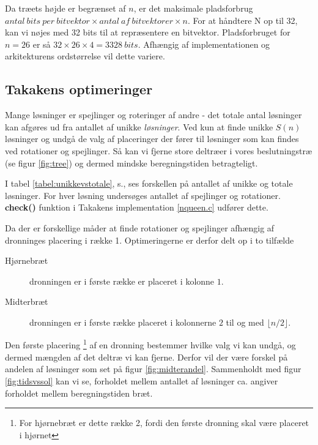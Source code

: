 \documentclass[draft,a4paper,11pt]{article}
\begin{document}
Da træets højde er begrænset af $n$, er det maksimale pladsforbrug $antal\ bits\ per\ bitvektor \times antal\ af\ bitvektorer \times n$. For at håndtere N op til 32, kan vi nøjes med 32 bits til at repræsentere en bitvektor. Pladsforbruget for $n=26$ er så $32\times 26 \times 4 = 3328\ bits$. Afhængig af implementationen og arkitekturens ordstørrelse vil dette variere. 

\subsection{Takakens optimeringer}\label{takalgo}

Mange løsninger er spejlinger og roteringer af andre - det totale antal løsninger kan afgøres ud fra antallet af unikke \emph{løsninger}. Ved kun at finde unikke $S(n)$ løsninger og undgå de valg af placeringer der fører til løsninger som kan findes ved rotationer og spejlinger. Så kan vi fjerne store deltræer i vores beslutningstræ (se figur \ref{fig:tree}) og dermed mindske beregningstiden betragteligt.

I tabel \ref{tabel:unikkevstotale}, s.\pageref{tabel:unikkevstotale}, ses forskellen på antallet af unikke og totale løsninger. For hver løsning undersøges antallet af spejlinger og rotationer. \textbf{check()} funktion i Takakens implementation \ref{nqueen.c} udfører dette. 
 
Da der er forskellige måder at finde rotationer og spejlinger afhængig af dronninges placering i række 1. Optimeringerne er derfor delt op i to tilfælde

\begin{description}
	\item[Hjørnebræt] dronningen er i første række er placeret i kolonne $1$.
	\item[Midterbræt] dronningen er i første række placeret i kolonnerne $2$  til og med $\lfloor n/2 \rfloor$.
\end{description}

Den første placering \footnote{For hjørnebræt er dette række 2, fordi den første dronning skal være placeret i hjørnet} af en dronning bestemmer hvilke valg vi kan undgå, og dermed mængden af det deltræ vi kan fjerne. Derfor vil der være forskel på andelen af løsninger som set på figur \ref{fig:midterandel}. Sammenholdt med figur \ref{fig:tidsvssol} kan vi se, forholdet mellem antallet af løsninger ca. angiver forholdet mellem beregningstiden bræt.
\end{document}
